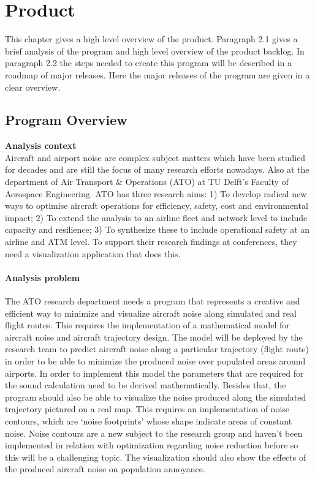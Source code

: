 \section{Product}

This chapter gives a high level overview of the product. Paragraph 2.1 gives a brief analysis of the program and high level overview of the product backlog. In paragraph 2.2 the steps needed to create this program will be described in a roadmap of major releases. Here the major releases of the program are given in a clear overview.

\subsection{Program Overview}

\textbf{Analysis context} \\
Aircraft and airport noise are complex subject matters which have been studied for decades and are still the focus of many research efforts nowadays. Also at the department of Air Transport \& Operations (ATO) at TU Delft’s Faculty of Aerospace Engineering. ATO has three research aims: 1) To develop radical new ways to optimise aircraft operations for efficiency, safety, cost and environmental impact; 2) To extend the analysis to an airline fleet and network level to include capacity and resilience; 3) To synthesize these to include operational safety at an airline and ATM level. To support their research findings at conferences, they need a visualization application that does this.

\paragraph{Analysis problem} 
The ATO research department needs a program that represents a creative and efficient way to minimize and visualize aircraft noise along simulated and real flight routes. This requires the implementation of a mathematical model for aircraft noise and aircraft trajectory design. The model will be deployed by the research team to predict aircraft noise along a particular trajectory (flight route) in order to be able to minimize the produced noise over populated areas around airports. In order to implement this model the parameters that are required for the sound calculation need to be derived mathematically. Besides that, the program should also be able to visualize the noise produced along the simulated trajectory pictured on a real map. This requires an implementation of noise contours, which are ‘noise footprints’ whose shape indicate areas of constant noise. Noise contours are a new subject to the research group and haven’t been implemented in relation with optimization regarding noise reduction before so this will be a challenging topic. The visualization should also show the effects of the produced aircraft noise on population annoyance.

